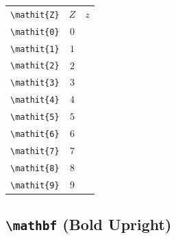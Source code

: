 \documentclass[12pt,a4paper]{article}
\begin{document}
\begin{longtable}{|c|c|c|}
\verb|\mathit{Z}| & $\mathit{Z}$ & $\mathit{z}$ \\ %
\verb|\mathit{0}| & $\mathit{0}$ & \\ %
\verb|\mathit{1}| & $\mathit{1}$ & \\ %
\verb|\mathit{2}| & $\mathit{2}$ & \\ %
\verb|\mathit{3}| & $\mathit{3}$ & \\ %
\verb|\mathit{4}| & $\mathit{4}$ & \\ %
\verb|\mathit{5}| & $\mathit{5}$ & \\ %
\verb|\mathit{6}| & $\mathit{6}$ & \\ %
\verb|\mathit{7}| & $\mathit{7}$ & \\ %
\verb|\mathit{8}| & $\mathit{8}$ & \\ %
\verb|\mathit{9}| & $\mathit{9}$ & \\ %
\hline
\end{longtable}

\newpage

\subsection*{\texttt{\textbackslash{}mathbf} (Bold Upright)}
\end{document}
